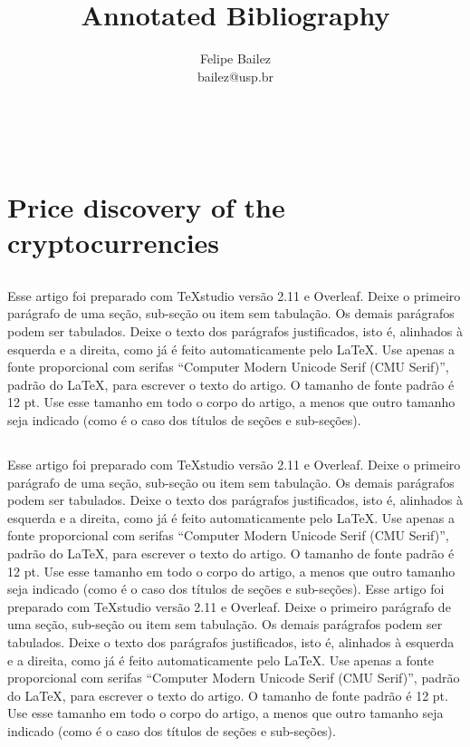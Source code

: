 \documentclass[12pt,letterpaper]{article}
\makeatletter
\renewcommand{\maketitle}{\bgroup
   \begin{center}
   \textbf{{\fontsize{18pt}{20}\selectfont \@title}}\\
   \vspace{10pt}
   {\fontsize{12pt}{0}\selectfont \@author} 
   \end{center}
}
\makeatother
\begin{document}
\title{Annotated Bibliography}
\author{Felipe Bailez \\ bailez@usp.br}

\maketitle
\thispagestyle{fancy}

\section*{Price discovery of the cryptocurrencies}

\subsection*{}
Esse artigo foi preparado com TeXstudio versão 2.11 e Overleaf. Deixe o primeiro parágrafo de uma seção, sub-seção ou item sem tabulação. Os demais parágrafos podem ser tabulados.  Deixe o texto dos parágrafos justificados, isto é, alinhados à esquerda e a direita, como já é feito automaticamente pelo LaTeX.    
Use apenas a fonte proporcional com serifas “Computer Modern Unicode Serif (CMU Serif)”, padrão do LaTeX, para escrever o texto do artigo.  O tamanho de fonte padrão é 12 pt.  Use esse tamanho em todo o corpo do artigo, a menos que outro tamanho seja indicado (como é o caso dos títulos de seções e sub-seções).

\subsection*{}
Esse artigo foi preparado com TeXstudio versão 2.11 e Overleaf. Deixe o primeiro parágrafo de uma seção, sub-seção ou item sem tabulação. Os demais parágrafos podem ser tabulados.  Deixe o texto dos parágrafos justificados, isto é, alinhados à esquerda e a direita, como já é feito automaticamente pelo LaTeX.    
Use apenas a fonte proporcional com serifas “Computer Modern Unicode Serif (CMU Serif)”, padrão do LaTeX, para escrever o texto do artigo.  O tamanho de fonte padrão é 12 pt.  Use esse tamanho em todo o corpo do artigo, a menos que outro tamanho seja indicado (como é o caso dos títulos de seções e sub-seções).
Esse artigo foi preparado com TeXstudio versão 2.11 e Overleaf. Deixe o primeiro parágrafo de uma seção, sub-seção ou item sem tabulação. Os demais parágrafos podem ser tabulados.  Deixe o texto dos parágrafos justificados, isto é, alinhados à esquerda e a direita, como já é feito automaticamente pelo LaTeX.    
Use apenas a fonte proporcional com serifas “Computer Modern Unicode Serif (CMU Serif)”, padrão do LaTeX, para escrever o texto do artigo.  O tamanho de fonte padrão é 12 pt.  Use esse tamanho em todo o corpo do artigo, a menos que outro tamanho seja indicado (como é o caso dos títulos de seções e sub-seções).
\end{document}
